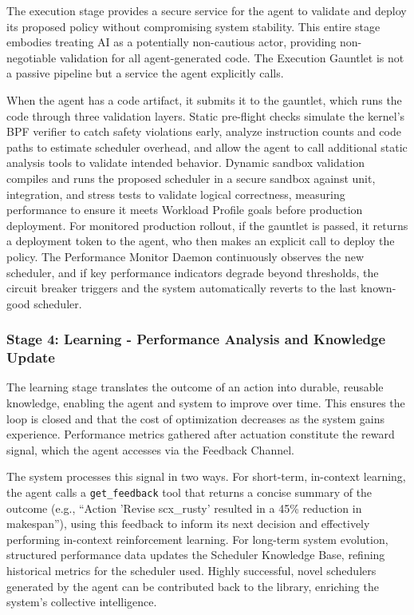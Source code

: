 The execution stage provides a secure service for the agent to validate and deploy its proposed policy without compromising system stability. This entire stage embodies treating AI as a potentially non-cautious actor, providing non-negotiable validation for all agent-generated code. The Execution Gauntlet is not a passive pipeline but a service the agent explicitly calls.

When the agent has a code artifact, it submits it to the gauntlet, which runs the code through three validation layers. Static pre-flight checks simulate the kernel's BPF verifier to catch safety violations early, analyze instruction counts and code paths to estimate scheduler overhead, and allow the agent to call additional static analysis tools to validate intended behavior. Dynamic sandbox validation compiles and runs the proposed scheduler in a secure sandbox against unit, integration, and stress tests to validate logical correctness, measuring performance to ensure it meets Workload Profile goals before production deployment. For monitored production rollout, if the gauntlet is passed, it returns a deployment token to the agent, who then makes an explicit call to deploy the policy. The Performance Monitor Daemon continuously observes the new scheduler, and if key performance indicators degrade beyond thresholds, the circuit breaker triggers and the system automatically reverts to the last known-good scheduler.

\subsubsection{Stage 4: Learning - Performance Analysis and Knowledge Update}

The learning stage translates the outcome of an action into durable, reusable knowledge, enabling the agent and system to improve over time. This ensures the loop is closed and that the cost of optimization decreases as the system gains experience. Performance metrics gathered after actuation constitute the reward signal, which the agent accesses via the Feedback Channel.

The system processes this signal in two ways. For short-term, in-context learning, the agent calls a \texttt{get\_feedback} tool that returns a concise summary of the outcome (e.g., ``Action 'Revise scx\_rusty' resulted in a 45\% reduction in makespan''), using this feedback to inform its next decision and effectively performing in-context reinforcement learning. For long-term system evolution, structured performance data updates the Scheduler Knowledge Base, refining historical metrics for the scheduler used. Highly successful, novel schedulers generated by the agent can be contributed back to the library, enriching the system's collective intelligence.


